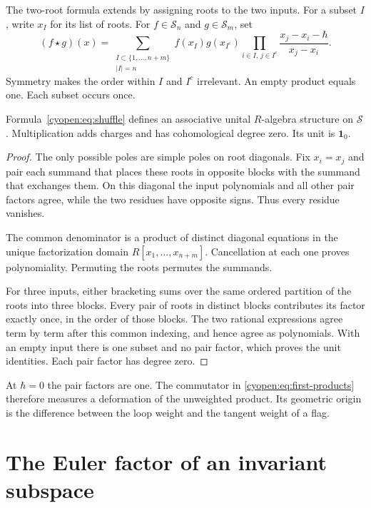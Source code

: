 The two-root formula extends by assigning roots to the two inputs.
For a subset $I$, write $x_I$ for its list of roots.
For $f\in\mathcal S_n$ and $g\in\mathcal S_m$, set
\begin{equation}\label{cyopen:eq:shuffle}
 (f\star g)(x)=
 \sum_{\substack{I\subset\{1,\ldots,n+m\}\\|I|=n}}
 f(x_I)g(x_{I^c})
 \prod_{i\in I,\,j\in I^c}
 \frac{x_j-x_i-\hbar}{x_j-x_i}.
\end{equation}
Symmetry makes the order within $I$ and $I^c$ irrelevant.
An empty product equals one. Each subset occurs once.

\begin{proposition}
\label{cyopen:prop:algebra}
Formula~\eqref{cyopen:eq:shuffle} defines an associative unital
$R$-algebra structure on $\mathcal S$. Multiplication adds charges
and has cohomological degree zero. Its unit is $\mathbf1_0$.
\end{proposition}
\begin{proof}
The only possible poles are simple poles on root diagonals.
Fix $x_i=x_j$ and pair each summand that places these roots in
opposite blocks with the summand that exchanges them.
On this diagonal the input polynomials and all other pair factors
agree, while the two residues have opposite signs.
Thus every residue vanishes.

The common denominator is a product
of distinct diagonal equations in the unique factorization domain
$R[x_1,\ldots,x_{n+m}]$.
Cancellation at each one proves polynomiality.
Permuting the roots permutes the summands.

For three inputs, either bracketing sums over the same ordered
partition of the roots into three blocks. Every pair of roots in
distinct blocks contributes its factor exactly once, in the order
of those blocks. The two rational expressions agree term by term
after this common indexing, and hence agree as polynomials.
With an empty input there is one subset and no pair factor,
which proves the unit identities. Each pair factor has degree zero.
\end{proof}

At $\hbar=0$ the pair factors are one. The commutator in
\eqref{cyopen:eq:first-products} therefore measures a deformation
of the unweighted product. Its geometric origin is the difference
between the loop weight and the tangent weight of a flag.

\section{The Euler factor of an invariant subspace}

